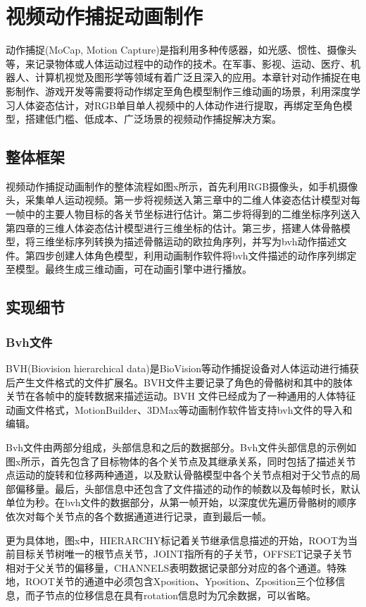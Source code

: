 
\chapter{视频动作捕捉动画制作}

动作捕捉(MoCap, Motion Capture)是指利用多种传感器，如光感、惯性、摄像头等，来记录物体或人体运动过程中的动作的技术。在军事、影视、运动、医疗、机器人、计算机视觉及图形学等领域有着广泛且深入的应用。本章针对动作捕捉在电影制作、游戏开发等需要将动作绑定至角色模型制作三维动画的场景，利用深度学习人体姿态估计，对RGB单目单人视频中的人体动作进行提取，再绑定至角色模型，搭建低门槛、低成本、广泛场景的视频动作捕捉解决方案。

\section{整体框架}

视频动作捕捉动画制作的整体流程如图x所示，首先利用RGB摄像头，如手机摄像头，采集单人运动视频。第一步将视频送入第三章中的二维人体姿态估计模型对每一帧中的主要人物目标的各关节坐标进行估计。第二步将得到的二维坐标序列送入第四章的三维人体姿态估计模型进行三维坐标的估计。第三步，搭建人体骨骼模型，将三维坐标序列转换为描述骨骼运动的欧拉角序列，并写为bvh动作描述文件。第四步创建人体角色模型，利用动画制作软件将bvh文件描述的动作序列绑定至模型。最终生成三维动画，可在动画引擎中进行播放。

\section{实现细节}
\subsection{Bvh文件}{}
BVH(Biovision hierarchical data)是BioVision等动作捕捉设备对人体运动进行捕获后产生文件格式的文件扩展名。BVH文件主要记录了角色的骨骼树和其中的肢体关节在各帧中的旋转数据来描述运动。BVH 文件已经成为了一种通用的人体特征动画文件格式，MotionBuilder、3DMax等动画制作软件皆支持bvh文件的导入和编辑。

Bvh文件由两部分组成，头部信息和之后的数据部分。Bvh文件头部信息的示例如图x所示，首先包含了目标物体的各个关节点及其继承关系，同时包括了描述关节点运动的旋转和位移两种通道，以及默认骨骼模型中各个关节点相对于父节点的局部偏移量。最后，头部信息中还包含了文件描述的动作的帧数以及每帧时长，默认单位为秒。在bvh文件的数据部分，从第一帧开始，以深度优先遍历骨骼树的顺序依次对每个关节点的各个数据通道进行记录，直到最后一帧。

更为具体地，图x中，HIERARCHY标记着关节继承信息描述的开始，ROOT为当前目标关节树唯一的根节点关节，JOINT指所有的子关节，OFFSET记录子关节相对于父关节的偏移量，CHANNELS表明数据记录部分对应的各个通道。特殊地，ROOT关节的通道中必须包含Xposition、Yposition、Zposition三个位移信息，而子节点的位移信息在具有rotation信息时为冗余数据，可以省略。

